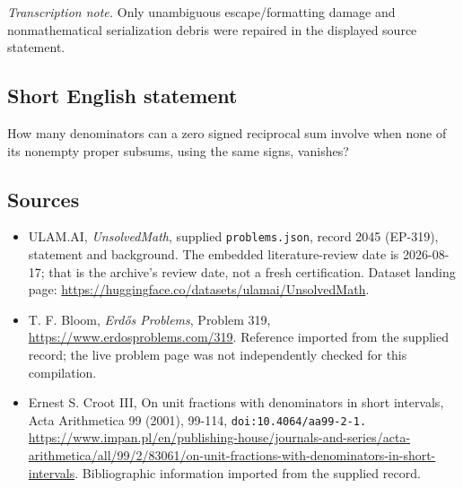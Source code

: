 \documentclass[11pt,a4paper]{article}
\begin{document}
{\small\emph{Transcription note.} Only unambiguous escape/formatting damage and nonmathematical serialization debris were repaired in the displayed source statement.}

\subsection{Short English statement}

How many denominators can a zero signed reciprocal sum involve when none of its nonempty proper subsums, using the same signs, vanishes?

\subsection{Sources}

{\small

\begin{itemize}

\item[\hypertarget{source:2045:1}{S1}] ULAM.AI, \emph{UnsolvedMath}, supplied \texttt{problems.json}, record 2045 (EP-319), statement and background. The embedded literature-review date is 2026-08-17; that is the archive’s review date, not a fresh certification. Dataset landing page: \url{https://huggingface.co/datasets/ulamai/UnsolvedMath}.

\item[\hypertarget{source:2045:2}{S2}] T. F. Bloom, \emph{Erdős Problems}, Problem 319, \url{https://www.erdosproblems.com/319}. Reference imported from the supplied record; the live problem page was not independently checked for this compilation.

\item[\hypertarget{source:2045:3}{S3}] Ernest S. Croot III, On unit fractions with denominators in short intervals, Acta Arithmetica 99 (2001), 99-114, \nolinkurl{doi:10.4064/aa99-2-1.} \url{https://www.impan.pl/en/publishing-house/journals-and-series/acta-arithmetica/all/99/2/83061/on-unit-fractions-with-denominators-in-short-intervals}. Bibliographic information imported from the supplied record.

\end{itemize}

}

\label{end:2045}
\end{document}
